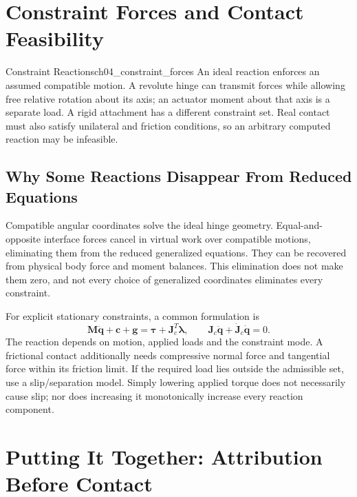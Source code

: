 \section{Constraint Forces and Contact Feasibility}

\begin{definition}{Constraint Reactions}{ch04_constraint_forces}
An ideal reaction enforces an assumed compatible motion. A revolute hinge can transmit forces while allowing free relative rotation about its axis; an actuator moment about that axis is a separate load. A rigid attachment has a different constraint set. Real contact must also satisfy unilateral and friction conditions, so an arbitrary computed reaction may be infeasible.
\end{definition}

\subsection*{Why Some Reactions Disappear From Reduced Equations}

Compatible angular coordinates solve the ideal hinge geometry. Equal-and-opposite interface forces cancel in virtual work over compatible motions, eliminating them from the reduced generalized equations. They can be recovered from physical body force and moment balances. This elimination does not make them zero, and not every choice of generalized coordinates eliminates every constraint.

For explicit stationary constraints, a common formulation is
\[
\bm M\ddot{\bm q}+\bm c+\bm g=\bm\tau+\bm J_c^T\bm\lambda,\qquad
\bm J_c\ddot{\bm q}+\dot{\bm J}_c\dot{\bm q}=0.
\]
The reaction depends on motion, applied loads and the constraint mode. A frictional contact additionally needs compressive normal force and tangential force within its friction limit. If the required load lies outside the admissible set, use a slip/separation model. Simply lowering applied torque does not necessarily cause slip; nor does increasing it monotonically increase every reaction component.

\section{Putting It Together: Attribution Before Contact}

